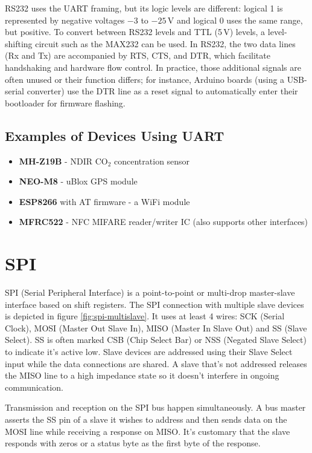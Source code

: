 RS232 uses the \gls{UART} framing, but its logic levels are different: logical 1 is represented by negative voltages $-3$ to $-25$\,V and logical 0 uses the same range, but positive. To convert between RS232 levels and \gls{TTL} (5\,V) levels, a level-shifting circuit such as the MAX232 can be used. In RS232, the two data lines (Rx and Tx) are accompanied by \gls{RTS}, \gls{CTS}, and \gls{DTR}, which facilitate handshaking and hardware flow control. In practice, those additional signals are often unused or their function differs; for instance, Arduino boards (using a USB-serial converter) use the \gls{DTR} line as a reset signal to automatically enter their bootloader for firmware flashing.

\subsection{Examples of Devices Using UART}

\begin{itemize}
	\item \textbf{MH-Z19B} - \gls{NDIR} CO$_2$ concentration sensor 
	\item \textbf{NEO-M8} - uBlox \gls{GPS} module
	\item \textbf{ESP8266} with AT firmware - a WiFi module
	\item \textbf{MFRC522} - \gls{NFC} MIFARE reader/writer \gls{IC} (also supports other interfaces)
\end{itemize}

\section{SPI} \label{sec:theory-spi}

SPI (Serial Peripheral Interface) is a point-to-point or multi-drop master-slave interface based on shift registers. The SPI connection with multiple slave devices is depicted in figure \ref{fig:spi-multislave}. It uses at least 4 wires: SCK (Serial Clock), MOSI (Master Out Slave In), MISO (Master In Slave Out) and SS (Slave Select). SS is often marked CSB (Chip Select Bar) or NSS (Negated Slave Select) to indicate it's active low. Slave devices are addressed using their Slave Select input while the data connections are shared. A slave that's not addressed releases the MISO line to a high impedance state so it doesn't interfere in ongoing communication.

Transmission and reception on the SPI bus happen simultaneously. A bus master asserts the SS pin of a slave it wishes to address and then sends data on the MOSI line while receiving a response on MISO. It's customary that the slave responds with zeros or a status byte as the first byte of the response.

